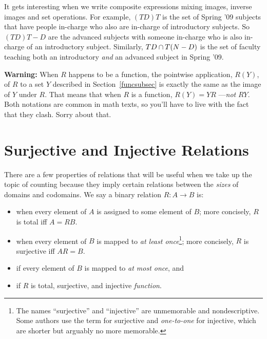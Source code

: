 It gets interesting when we write composite expressions mixing images,
inverse images and set operations.  For example, $(TD)T$ is the set of
Spring '09 subjects that have people in-charge who also are in-charge of
introductory subjects.  So $(TD)T - D$ are the advanced subjects with
someone in-charge who is also in-charge of an introductory subject.
Similarly, $TD \cap T(N-D)$ is the set of faculty teaching both an
introductory \emph{and} an advanced subject in Spring '09.

\textbf{Warning:} When $R$ happens to be a function, the pointwise
application, $R(Y)$, of $R$ to a set $Y$ described in
Section~\ref{funcsubsec} is exactly the same as the image of $Y$ under
$R$.  That means that when $R$ is a function, $R(Y) = YR$ ---\emph{not}
$RY$.  Both notations are common in math texts, so you'll have to live
with the fact that they clash.  Sorry about that.

\section{Surjective and Injective Relations}\label{surj_sec}

There are a few properties of relations that will be useful when we take
up the topic of counting because they imply certain relations between the
\emph{sizes} of domains and codomains.  We say a binary relation $R : A
\to B$ is:

\begin{itemize}

\item {} when every element of $A$ is assigned to some element of
  $B$; more concisely, $R$ is total iff $A=RB$.

\item {} when every element of $B$ is mapped to \textit{at
least once}\footnote{
The names ``surjective'' and ``injective'' are unmemorable and
nondescriptive.  Some authors use the term  for surjective and
\emph{one-to-one} for injective, which are shorter but arguably no more
memorable.}; more concisely, $R$ is surjective iff $AR=B$.

\item {} if every element of $B$ is mapped to \textit{at
most once}, and

\item {} if $R$ is total, surjective, and injective
  \emph{function}.

\end{itemize}

